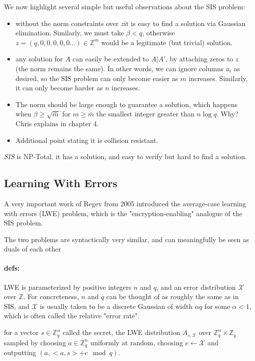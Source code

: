 We now highlight several simple but useful observations about the SIS problem:
\begin{itemize}
    \item without the norm constraints over $z$it is easy to find a solution via Gaussian elimination. Similarly, we
must take $\beta < q$, otherwise $z=(q,0,0,0,0,0...)\in \mathbb{Z}^m$ would be a legitimate (but trivial) solution.
\item any solution for $A$ can easily be extended to $A|A'$, by attaching zeros to $z$ (the norm remains the same). In other
words, we can ignore columns $a_i$ as desired, so the SIS problem can only become easier as $m$ increases. Similarly, it can only become harder as $n$ increases.
\item The norm should be large enough to guarantee a solution, which happens when $\beta  \ge \sqrt{\bar{m}}$ for $m\ge\bar{m}$ the smallest integer greater than $n\log q$. Why? Chris explains in chapter 4.
\item Additional point stating it is collision resistant.
\end{itemize}


\emph{SIS} is NP-Total. it has a solution, and easy to verify but hard to find a solution.
\subsection{Learning With Errors}
A very important work of Regev  from 2005 introduced the average-case learning with errors (LWE)
problem, which is the "encryption-enabling" analogue of the SIS problem.

The two problems are syntactically very similar, and can meaningfully be seen as duals of each other

\paragraph{defs:}
LWE is parameterized by positive integers $n$ and $q$, and an error distribution $\mathcal{X}$ over $\mathbb{Z}$. For concreteness, $n$
and $q$ can be thought of as roughly the same as in SIS, and $\mathcal{X}$ is usually taken to be a discrete Gaussian of
width $\alpha q$ for some $\alpha<1$, which is often called the relative "error rate".

\begin{definition} 
    for a vector $s\in\mathbb{Z}_q^n$ called the secret, the LWE distribution
    $A_{s,\mathcal{X}}$ over $\mathbb{Z}_q^n \times \mathbb{Z}_q$ sampled by choosing $a\in \mathbb{Z}_q^n$ uniformly at random, choosing $e\leftarrow\mathcal{X}$ and outputting $(a, <a,s>+e \mod q)$.
\end{definition}

